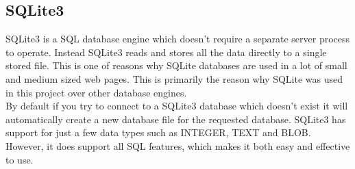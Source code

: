 \subsection{SQLite3}
SQLite3 is a SQL database engine which doesn't require a separate server process to operate. Instead SQLite3 reads and stores all the data directly to a single stored file. This is one of reasons why SQLite databases are used in a lot of small and medium sized web pages. This is primarily the reason why SQLite was used in this project over other database engines.
\\[11pt]
By default if you try to connect to a SQLite3 database which doesn't exist it will automatically create a new database file for the requested database. SQLite3 has support for just a few data types such as INTEGER, TEXT and BLOB. However, it does support all SQL features, which makes it both easy and effective to use.